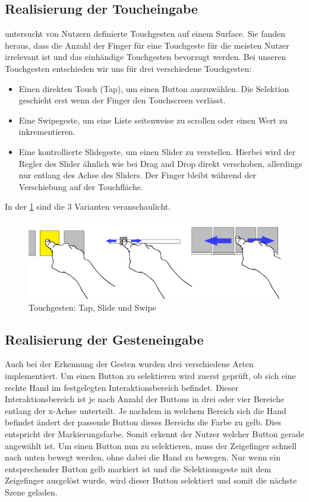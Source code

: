\subsection[Touch]{Realisierung der Toucheingabe} 
\citet{Wobbrock:2009} untersucht von Nutzern definierte Touchgesten auf einem Surface. 
Sie fanden heraus, dass die Anzahl der Finger für eine Touchgeste für die meisten Nutzer irrelevant ist und das einhändige Touchgesten bevorzugt werden. 
Bei unseren Touchgesten entschieden wir uns für drei verschiedene Touchgesten:
\begin{itemize}
\item Einen direkten Touch (Tap), um einen Button auszuwählen. 
Die Selektion geschieht erst wenn der Finger den Touchscreen verlässt. 
\item Eine Swipegeste, um eine Liste seitenweise zu scrollen oder einen Wert zu inkrementieren.
\item Eine kontrollierte Slidegeste, um einen Slider zu verstellen.
Hierbei wird der Regler des Slider ähnlich wie bei Drag and Drop direkt verschoben, allerdings nur entlang des Achse des Sliders.
Der Finger bleibt während der Verschiebung auf der Touchfläche.
\end{itemize}
In der \ref{fig:TouchGestures} sind die 3 Varianten veranschaulicht.
\begin{figure}
	\centering
		\includegraphics[width=1\textwidth]{img/TouchGestures.jpg}
	\caption{Touchgesten: Tap, Slide und Swipe}
	\label{fig:TouchGestures}
\end{figure}

\subsection[Geste]{Realisierung der Gesteneingabe}
Auch bei der Erkennung der Gesten wurden drei verschiedene Arten implementiert. 
Um einen Button zu selektieren wird zuerst geprüft, ob sich eine rechte Hand im festgelegten Interaktionsbereich befindet. 
Dieser Interaktionsbereich ist je nach Anzahl der Buttons in drei oder vier Bereiche entlang der x-Achse unterteilt. 
Je nachdem in welchem Bereich sich die Hand befindet ändert der passende Button dieses Bereichs die Farbe zu gelb.
Dies entspricht der Markierungsfarbe. 
Somit erkennt der Nutzer welcher Button gerade angewählt ist. 
Um einen Button nun zu selektieren, muss der Zeigefinger schnell nach unten bewegt werden, ohne dabei die Hand zu bewegen. 
Nur wenn ein entsprechender Button gelb markiert ist und die Selektionsgeste mit dem Zeigefinger ausgelöst wurde, wird dieser Button selektiert und somit die nächste Szene geladen. 

